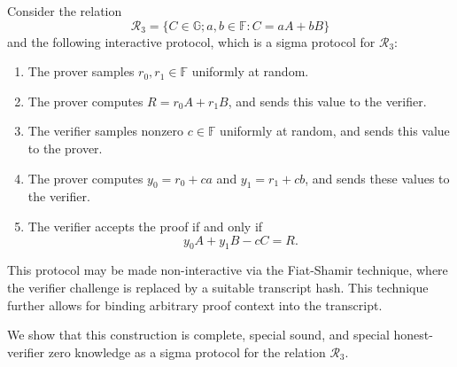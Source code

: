\documentclass{article}
\newcommand{\G}{\mathbb{G}}
\newcommand{\F}{\mathbb{F}}
\begin{document}
Consider the relation
$$\mathcal{R}_3 = \{C \in \G; a,b \in \F : C = aA + bB\}$$
and the following interactive protocol, which is a sigma protocol for $\mathcal{R}_3$:
\begin{enumerate}
	\item The prover samples $r_0, r_1 \in \F$ uniformly at random.
	\item The prover computes $R = r_0 A + r_1 B$, and sends this value to the verifier.
	\item The verifier samples nonzero $c \in \F$ uniformly at random, and sends this value to the prover.
	\item The prover computes $y_0 = r_0 + ca$ and $y_1 = r_1 + cb$, and sends these values to the verifier.
	\item The verifier accepts the proof if and only if
	\begin{equation}
		\label{eqn:representation}
		y_0 A + y_1 B - cC = R.
	\end{equation}
\end{enumerate}
This protocol may be made non-interactive via the Fiat-Shamir technique, where the verifier challenge is replaced by a suitable transcript hash.
This technique further allows for binding arbitrary proof context into the transcript.

We show that this construction is complete, special sound, and special honest-verifier zero knowledge as a sigma protocol for the relation $\mathcal{R}_3$.
\end{document}
